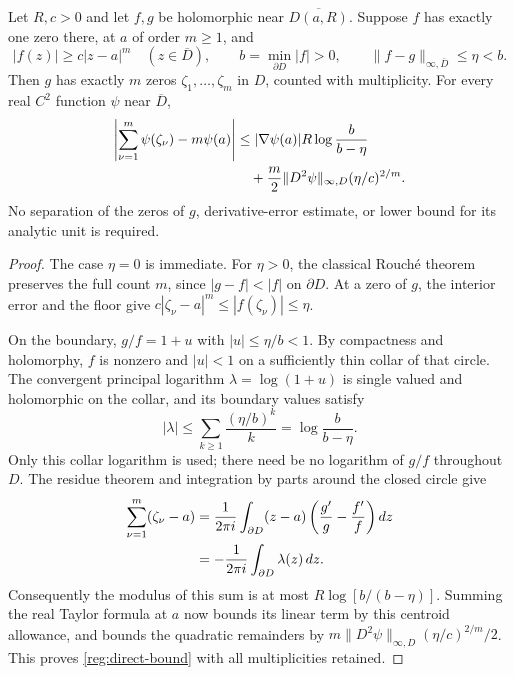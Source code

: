 \begin{theorem}
\label{reg:direct-divisor}
Let $R,c>0$ and let $f,g$ be holomorphic near $\overline{D(a,R)}$. Suppose $f$ has
exactly one zero there, at $a$ of order $m\ge1$, and
\[
 |f(z)|\ge c|z-a|^m\quad(z\in\overline D),\qquad
 b=\min_{\partial D}|f|>0,\qquad
 \|f-g\|_{\infty,\overline D}\le\eta<b.
\]
Then $g$ has exactly $m$ zeros $\zeta_1,\ldots,\zeta_m$ in $D$,
counted with multiplicity. For every real $C^2$ function $\psi$ near
$\overline D$,
\begin{align}
 \left|\sum_{\nu=1}^m\psi(\zeta_\nu)-m\psi(a)\right|
 &\le |\nabla\psi(a)|R\log\frac b{b-\eta}\notag\\
 &\quad+\frac m2\|D^2\psi\|_{\infty,D}(\eta/c)^{2/m}.
 \label{reg:direct-bound}
\end{align}
No separation of the zeros of $g$, derivative-error estimate, or lower
bound for its analytic unit is required.
\end{theorem}
\begin{proof}
The case $\eta=0$ is immediate. For $\eta>0$, the classical
Rouch\'e theorem preserves the full count $m$, since $|g-f|<|f|$
on $\partial D$. At a zero of $g$, the interior error and the floor
give $c|\zeta_\nu-a|^m\le|f(\zeta_\nu)|\le\eta$.

On the boundary, $g/f=1+u$ with $|u|\le\eta/b<1$. By compactness
and holomorphy, $f$ is nonzero and $|u|<1$ on a sufficiently thin
collar of that circle. The convergent principal logarithm
$\lambda=\log(1+u)$ is single valued and holomorphic on the collar,
and its boundary values satisfy
\[
 |\lambda|\le\sum_{k\ge1}\frac{(\eta/b)^k}{k}
                  =\log\frac b{b-\eta}.
\]
Only this collar logarithm is used; there need be no logarithm of
$g/f$ throughout $D$. The residue theorem and integration by parts
around the closed circle give
\begin{align}
 \sum_{\nu=1}^m(\zeta_\nu-a)
 &=\frac1{2\pi i}\int_{\partial D}(z-a)
          \left(\frac{g'}g-\frac{f'}f\right)dz\notag\\
 &=-\frac1{2\pi i}\int_{\partial D}\lambda(z)\,dz.
 \label{reg:centroid-trace}
\end{align}
Consequently the modulus of this sum is at most
$R\log[b/(b-\eta)]$. Summing the real Taylor formula at $a$
now bounds its linear term by this centroid allowance, and bounds the
quadratic remainders by
$m\|D^2\psi\|_{\infty,D}(\eta/c)^{2/m}/2$. This proves
\eqref{reg:direct-bound} with all multiplicities retained.
\end{proof}

